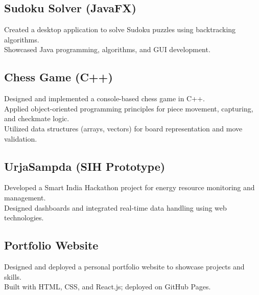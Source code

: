 \documentclass[]{deedy-resume-openfont}
\begin{document}
\begin{minipage}[t]{0.66\textwidth}
\subsection*{Sudoku Solver (JavaFX)}
Created a desktop application to solve Sudoku puzzles using backtracking algorithms. \\
Showcased Java programming, algorithms, and GUI development. \\

\subsection*{Chess Game (C++)}
Designed and implemented a console-based chess game in C++. \\
Applied object-oriented programming principles for piece movement, capturing, and checkmate logic. \\
Utilized data structures (arrays, vectors) for board representation and move validation. \\

\subsection*{UrjaSampda (SIH Prototype)}
Developed a Smart India Hackathon project for energy resource monitoring and management. \\
Designed dashboards and integrated real-time data handling using web technologies. \\

\subsection*{Portfolio Website}
Designed and deployed a personal portfolio website to showcase projects and skills. \\
Built with HTML, CSS, and React.js; deployed on GitHub Pages. \\






\end{minipage} 
\end{document}
